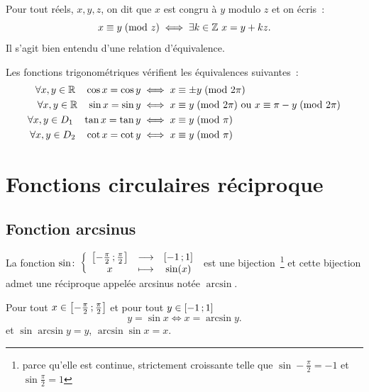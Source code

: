 \begin{defdef}[Congruence]
  Pour tout réels, \(x, y, z\), on dit que \(x\) est congru à \(y\) modulo 
  \(z\) et on écris~:
  \begin{equation}
    x \equiv y\!\pmod {z} \iff \exists k \in \mathbb{Z} \ x = y + kz.
  \end{equation}
  Il s'agit bien entendu d'une relation d'équivalence.
\end{defdef}

\begin{prop}
  Les fonctions trigonométriques vérifient les équivalences suivantes~:
  \begin{align*}
    \forall x, y \in \mathbb{R} \quad \cos x = \cos y &\iff x \equiv \pm y\!\pmod {2\pi}\\
    \forall x, y \in \mathbb{R} \quad \sin x = \sin y &\iff x \equiv y\!\pmod {2\pi} 
    \text{~ou~} x \equiv \pi-y\!\pmod {2\pi}\\
    \forall x, y \in D_1 \quad \tan x = \tan y &\iff x \equiv y\!\pmod {\pi}\\
    \forall x, y \in D_2 \quad \cot x = \cot y &\iff x \equiv y\!\pmod {\pi}
  \end{align*}
\end{prop}

\section{Fonctions circulaires 
réciproque}\label{sec:chap1-fonctionscircréciproques}

\subsection{Fonction arcsinus}\label{subsec:chap1-fonctionarcsinus}

\begin{defdef}
  La fonction 
  \(\sin\colon\left\{\begin{array}{ccc}\left[ -\frac{\pi}{2} \, ; {} \frac{\pi}{2} \right] & \longrightarrow &\left[ -1 \, ; {} 1 \right]\\x & \longmapsto & \sin(x)\end{array}\right.\)
  est une bijection~\footnote{parce qu'elle est continue, strictement
  croissante telle que \(\sin -\frac{\pi}{2} = -1\)  et \(\sin \frac{\pi}{2} = 
  1\)} et cette bijection admet une réciproque appelée arcsinus notée 
  \(\arcsin\).
\end{defdef}

\begin{prop}
  Pour tout \(x \in \left[ -\frac{\pi}{2} \, ; {} \frac{\pi}{2} \right]\) et  pour 
  tout \(y \in \left[ -1 \, ; {} 1 \right]\)
  \begin{equation}
    y = \sin x \iff x = \arcsin y.
  \end{equation}
  et \(\sin{\arcsin{y}} = y\), \(\arcsin{\sin{x}} = x\).
\end{prop}

